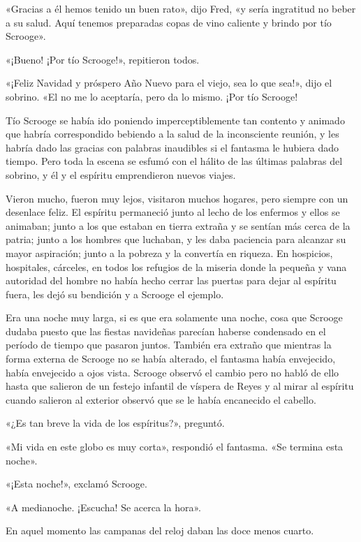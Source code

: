 \documentclass{novela}
\begin{document}
 «Gracias a él hemos tenido un buen rato», dijo Fred, «y sería ingratitud no beber a su salud. Aquí tenemos preparadas copas de vino caliente y brindo por tío Scrooge».

 «¡Bueno! ¡Por tío Scrooge!», repitieron todos.

 «¡Feliz Navidad y próspero Año Nuevo para el viejo, sea lo que sea!», dijo el sobrino. «El no me lo aceptaría, pero da lo mismo. ¡Por tío Scrooge!

 Tío Scrooge se había ido poniendo imperceptiblemente tan contento y animado que habría correspondido bebiendo a la salud de la inconsciente reunión, y les habría dado las gracias con palabras inaudibles si el fantasma le hubiera dado tiempo. Pero toda la escena se esfumó con el hálito de las últimas palabras del sobrino, y él y el espíritu emprendieron nuevos viajes.

 Vieron mucho, fueron muy lejos, visitaron muchos hogares, pero siempre con un desenlace feliz. El espíritu permaneció junto al lecho de los enfermos y ellos se animaban; junto a los que estaban en tierra extraña y se sentían más cerca de la patria; junto a los hombres que luchaban, y les daba paciencia para alcanzar su mayor aspiración; junto a la pobreza y la convertía en riqueza. En hospicios, hospitales, cárceles, en todos los refugios de la miseria donde la pequeña y vana autoridad del hombre no había hecho cerrar las puertas para dejar al espíritu fuera, les dejó su bendición y a Scrooge el ejemplo.

 Era una noche muy larga, si es que era solamente una noche, cosa que Scrooge dudaba puesto que las fiestas navideñas parecían haberse condensado en el período de tiempo que pasaron juntos. También era extraño que mientras la forma externa de Scrooge no se había alterado, el fantasma había envejecido, había envejecido a ojos vista. Scrooge observó el cambio pero no habló de ello hasta que salieron de un festejo infantil de víspera de Reyes y al mirar al espíritu cuando salieron al exterior observó que se le había encanecido el cabello.

 «¿Es tan breve la vida de los espíritus?», preguntó.

 «Mi vida en este globo es muy corta», respondió el fantasma. «Se termina esta noche».

 «¡Esta noche!», exclamó Scrooge.

 «A medianoche. ¡Escucha! Se acerca la hora».

 En aquel momento las campanas del reloj daban las doce menos cuarto.
\end{document}
